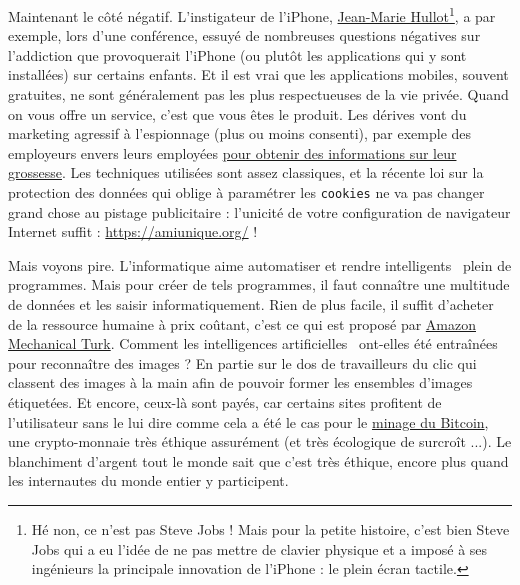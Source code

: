 \documentclass[10pt]{article}
\begin{document}
Maintenant le côté négatif. L'instigateur de l'iPhone, \href{https://fr.wikipedia.org/wiki/Jean-Marie_Hullot}{Jean-Marie Hullot}\footnote{
  Hé non, ce n'est pas Steve Jobs ! Mais pour la petite histoire, c'est bien Steve Jobs qui a eu l'idée de ne pas mettre de clavier physique
  et a imposé à ses ingénieurs la principale innovation de l'iPhone : le plein écran tactile.
}, a par exemple, lors d'une conférence, essuyé de nombreuses questions négatives sur l'addiction que provoquerait l'iPhone
(ou plutôt les applications qui y sont installées) sur certains enfants. Et il est vrai que les applications mobiles, souvent gratuites,
ne sont généralement pas les plus respectueuses de la vie privée. Quand on vous offre un service, c'est que vous êtes le produit.
Les dérives vont du marketing agressif à l'espionnage (plus ou moins consenti), par exemple des employeurs envers leurs employées
\href{https://www.lemonde.fr/pixels/article/2019/04/12/aux-etats-unis-des-employeurs-font-main-basse-sur-les-donnees-des-applications-de-grossesse_5449283_4408996.html}{pour obtenir des informations sur leur grossesse}.
Les techniques utilisées sont assez classiques, et la récente loi sur la protection des données qui oblige à paramétrer les \texttt{cookies}
ne va pas changer grand chose au pistage publicitaire : l'unicité de votre configuration de navigateur Internet suffit :
\url{https://amiunique.org/} !


Mais voyons pire. L'informatique aime automatiser et rendre \og intelligents \fg~plein de programmes. Mais pour créer de tels programmes,
il faut connaître une multitude de données et les saisir informatiquement. Rien de plus facile, il suffit
d'acheter de la ressource humaine à prix coûtant, c'est ce qui est proposé par \href{https://www.mturk.com/}{Amazon Mechanical Turk}.
Comment les intelligences \og artificielles \fg~ont-elles été entraînées pour reconnaître des images ?
En partie sur le dos de travailleurs du clic qui classent des images à la main afin de pouvoir former les ensembles d'images étiquetées.
Et encore, ceux-là sont payés, car certains sites profitent de l'utilisateur sans le lui dire comme cela a été le cas pour le
\href{https://www.lemonde.fr/pixels/article/2018/01/31/ces-logiciels-qui-utilisent-votre-ordinateur-pour-fabriquer-des-cryptomonnaies_5249816_4408996.html}{minage du Bitcoin},
une crypto-monnaie très éthique assurément (et très écologique de surcroît ...).
Le blanchiment d'argent tout le monde sait que c'est très éthique, encore plus quand les internautes du monde entier y participent.
\end{document}
